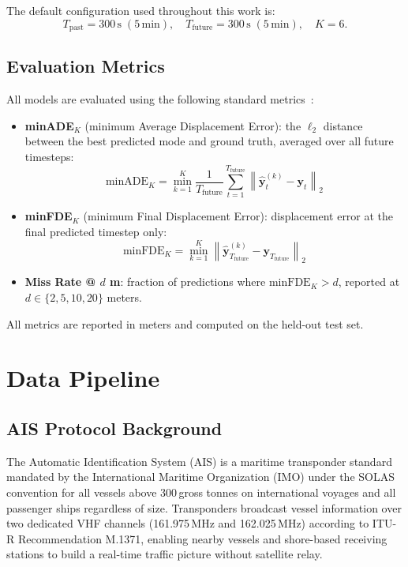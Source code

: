 \documentclass[12pt, a4paper]{article}
\begin{document}
  The default configuration used throughout this work is:
  \[
      T_{\text{past}} = 300\,\text{s}\;(5\,\text{min}),
      \quad T_{\text{future}} = 300\,\text{s}\;(5\,\text{min}),
      \quad K = 6.
  \]

  \subsection{Evaluation Metrics}
  \label{sec:metrics}

  All models are evaluated using the following standard metrics~\citep{feng2024unitraj}:

  \begin{itemize}
      \item \textbf{minADE$_K$} (minimum Average Displacement Error): the $\ell_2$ distance between the best predicted mode and ground truth, averaged over all future timesteps:
      \[
          \text{minADE}_K = \min_{k=1}^{K} \frac{1}{T_{\text{future}}} \sum_{t=1}^{T_{\text{future}}} \left\| \hat{\mathbf{y}}^{(k)}_t - \mathbf{y}_t \right\|_2
      \]

      \item \textbf{minFDE$_K$} (minimum Final Displacement Error): displacement error at the final predicted timestep only:
      \[
          \text{minFDE}_K = \min_{k=1}^{K} \left\| \hat{\mathbf{y}}^{(k)}_{T_{\text{future}}} - \mathbf{y}_{T_{\text{future}}} \right\|_2
      \]

      \item \textbf{Miss Rate @ $d$ m}: fraction of predictions where $\text{minFDE}_K > d$, reported at $d \in \{2, 5, 10, 20\}$ meters.
  \end{itemize}

  All metrics are reported in meters and computed on the held-out test set.

  \section{Data Pipeline}
  \label{sec:pipeline}


  \subsection{AIS Protocol Background}
  \label{sec:ais_background}

  The Automatic Identification System (AIS) is a maritime transponder standard mandated by
  the International Maritime Organization (IMO) under the SOLAS convention for all vessels
  above 300\,gross tonnes on international voyages and all passenger ships regardless of size.
  Transponders broadcast vessel information over two dedicated VHF channels (161.975\,MHz and
  162.025\,MHz) according to ITU-R Recommendation M.1371, enabling nearby vessels and
  shore-based receiving stations to build a real-time traffic picture without satellite relay.
\end{document}
